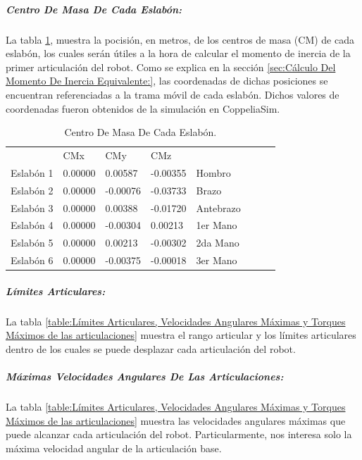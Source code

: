 \documentclass{article}
\begin{document}
\begin{sloppypar}
\subparagraph{Centro De Masa De Cada Eslabón:}
\label{sec:Centro De Masa De Cada Eslabón:}
\hfill \break
La tabla \ref{table:Centro De Masa De Cada Eslabón}, muestra la pocisión, en metros, de los centros de masa (CM) de cada eslabón, los cuales serán útiles a la hora de calcular el momento de inercia de la primer articulación del robot. Como se explica en la sección \ref{sec:Cálculo Del Momento De Inercia Equivalente:}, las coordenadas de dichas posiciones se encuentran referenciadas a la trama móvil de cada eslabón. Dichos valores de coordenadas fueron obtenidos de la simulación en CoppeliaSim.
\begin{table}[H]
\begin{center}
\begin{tabular}{l|lll|lll|l}
\cline{2-4}
          & CMx     & CMy      & CMz      &              \\ \cline{2-4}
Eslabón 1 & 0.00000 &  0.00587 & -0.00355 & Hombro       \\
Eslabón 2 & 0.00000 & -0.00076 & -0.03733 & Brazo        \\
Eslabón 3 & 0.00000 &  0.00388 & -0.01720 & Antebrazo    \\
Eslabón 4 & 0.00000 & -0.00304 &  0.00213 & 1er Mano  \\
Eslabón 5 & 0.00000 &  0.00213 & -0.00302 & 2da Mano \\
Eslabón 6 & 0.00000 & -0.00375 & -0.00018 & 3er Mano  \\ \cline{2-4}
\end{tabular}
\caption{\label{table:Centro De Masa De Cada Eslabón}Centro De Masa De Cada Eslabón.}
\end{center}
\end{table}


\subparagraph{Límites Articulares:}
\label{sec:Límites Articulares:}
\hfill \break
La tabla \ref{table:Límites Articulares, Velocidades Angulares Máximas y Torques Máximos de las articulaciones} muestra el rango articular y los límites articulares dentro de los cuales se puede desplazar cada articulación del robot.

\subparagraph{Máximas Velocidades Angulares De Las Articulaciones:}
\label{sec:Máximas Velocidades Angulares De Las Articulaciones:}
\hfill \break
La tabla \ref{table:Límites Articulares, Velocidades Angulares Máximas y Torques Máximos de las articulaciones} muestra las velocidades angulares máximas que puede alcanzar cada articulación del robot. Particularmente, nos interesa solo la máxima velocidad angular de la articulación base.


\end{sloppypar}
\end{document}
